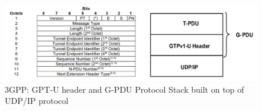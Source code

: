 \begin{figure}[H]
	\centering
	\includegraphics[width=1.0\textwidth]{resources/images/gptu_header_and_gpdu_stack.PNG}
	\caption{3GPP: GPT-U header and G-PDU Protocol Stack built on top of UDP/IP protocol \cite{3gpp_gptu}}
    \label{fig:related_work:gptu_header_and_gpdu_stack}
\end{figure}












